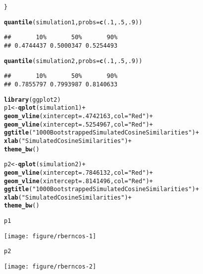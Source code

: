 \documentclass[12pt]{article}\usepackage[]{graphicx}\usepackage[]{color}
\makeatletter
\newcommand{\hlnum}[1]{\textcolor[rgb]{0.686,0.059,0.569}{#1}}%
\newcommand{\hlstr}[1]{\textcolor[rgb]{0.192,0.494,0.8}{#1}}%
\newcommand{\hlopt}[1]{\textcolor[rgb]{0,0,0}{#1}}%
\newcommand{\hlstd}[1]{\textcolor[rgb]{0.345,0.345,0.345}{#1}}%
\newcommand{\hlkwb}[1]{\textcolor[rgb]{0.69,0.353,0.396}{#1}}%
\newcommand{\hlkwc}[1]{\textcolor[rgb]{0.333,0.667,0.333}{#1}}%
\newcommand{\hlkwd}[1]{\textcolor[rgb]{0.737,0.353,0.396}{\textbf{#1}}}%
\newenvironment{kframe}{%
 \def\at@end@of@kframe{}%
 \ifinner\ifhmode%
  \def\at@end@of@kframe{\end{minipage}}%
  \begin{minipage}{\columnwidth}%
 \fi\fi%
 \def\FrameCommand##1{\hskip\@totalleftmargin \hskip-\fboxsep
 \colorbox{shadecolor}{##1}\hskip-\fboxsep
     \hskip-\linewidth \hskip-\@totalleftmargin \hskip\columnwidth}%
 \MakeFramed {\advance\hsize-\width
   \@totalleftmargin\z@ \linewidth\hsize
   \@setminipage}}%
 {\par\unskip\endMakeFramed%
 \at@end@of@kframe}
\newenvironment{knitrout}{}{} %
\makeatother
\begin{document}
\begin{flushleft}
\begin{center}
\begin{knitrout}
\begin{kframe}
\begin{alltt}
\hlstd{\}}

\hlkwd{quantile}\hlstd{(simulation1,}  \hlkwc{probs} \hlstd{=} \hlkwd{c}\hlstd{(}\hlnum{.1}\hlstd{,} \hlnum{.5}\hlstd{,} \hlnum{.9}\hlstd{))}
\end{alltt}
\begin{verbatim}
##       10%       50%       90% 
## 0.4744437 0.5000347 0.5254493
\end{verbatim}
\begin{alltt}
\hlkwd{quantile}\hlstd{(simulation2,}  \hlkwc{probs} \hlstd{=} \hlkwd{c}\hlstd{(}\hlnum{.1}\hlstd{,} \hlnum{.5}\hlstd{,} \hlnum{.9}\hlstd{))}
\end{alltt}
\begin{verbatim}
##       10%       50%       90% 
## 0.7855797 0.7993987 0.8140633
\end{verbatim}
\begin{alltt}
\hlkwd{library}\hlstd{(ggplot2)}
\hlstd{p1} \hlkwb{<-} \hlkwd{qplot}\hlstd{(simulation1)}\hlopt{+}
  \hlkwd{geom_vline}\hlstd{(}\hlkwc{xintercept} \hlstd{=} \hlnum{.4742163}\hlstd{,} \hlkwc{col}\hlstd{=}\hlstr{"Red"}\hlstd{)}\hlopt{+}
  \hlkwd{geom_vline}\hlstd{(}\hlkwc{xintercept} \hlstd{=} \hlnum{.5254967}\hlstd{,} \hlkwc{col}\hlstd{=}\hlstr{"Red"}\hlstd{)}\hlopt{+}
  \hlkwd{ggtitle}\hlstd{(}\hlstr{"1000 Bootstrapped Simulated Cosine Similarities"}\hlstd{)}\hlopt{+}
  \hlkwd{xlab}\hlstd{(}\hlstr{"Simulated Cosine Similarities"}\hlstd{)}\hlopt{+}
  \hlkwd{theme_bw}\hlstd{()}

\hlstd{p2} \hlkwb{<-} \hlkwd{qplot}\hlstd{(simulation2)}\hlopt{+}
  \hlkwd{geom_vline}\hlstd{(}\hlkwc{xintercept} \hlstd{=} \hlnum{.7846132}\hlstd{,} \hlkwc{col}\hlstd{=}\hlstr{"Red"}\hlstd{)}\hlopt{+}
  \hlkwd{geom_vline}\hlstd{(}\hlkwc{xintercept} \hlstd{=} \hlnum{.8141496}\hlstd{,} \hlkwc{col}\hlstd{=}\hlstr{"Red"}\hlstd{)}\hlopt{+}
  \hlkwd{ggtitle}\hlstd{(}\hlstr{"1000 Bootstrapped Simulated Cosine Similarities"}\hlstd{)}\hlopt{+}
  \hlkwd{xlab}\hlstd{(}\hlstr{"Simulated Cosine Similarities"}\hlstd{)}\hlopt{+}
  \hlkwd{theme_bw}\hlstd{()}

\hlstd{p1}
\end{alltt}
\end{kframe}
\texttt{[image: figure/rberncos-1]} 
\begin{kframe}\begin{alltt}
\hlstd{p2}
\end{alltt}
\end{kframe}
\texttt{[image: figure/rberncos-2]} 

\end{knitrout}
\end{center}


\end{flushleft}
\end{document}
